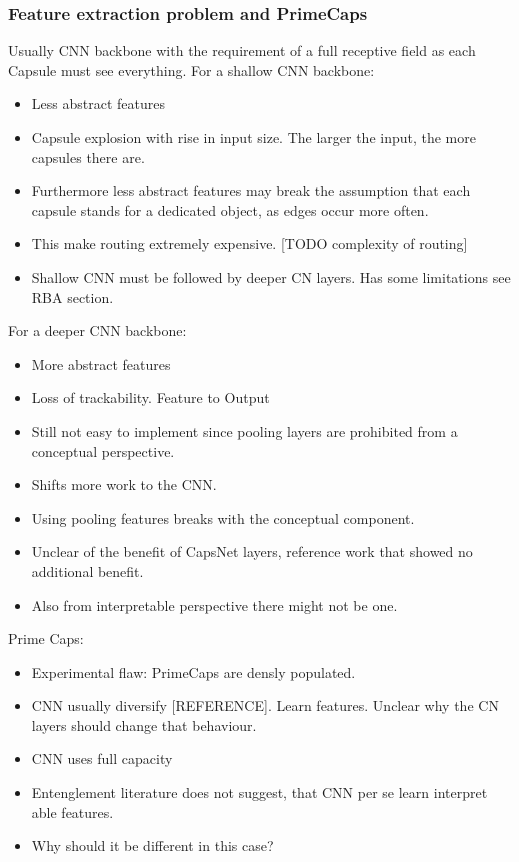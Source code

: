 \documentclass{article}
\begin{document}
\subsubsection*{Feature extraction problem and PrimeCaps}
Usually CNN backbone with the requirement of a full receptive field as each Capsule must see everything.
For a shallow CNN backbone:
\begin{itemize}
	\item Less abstract features
	\item Capsule explosion with rise in input size. The larger the input, the more capsules there are.
	\item Furthermore less abstract features may break the assumption that each capsule stands for a dedicated object, as edges occur more often.
	\item This make routing extremely expensive. [TODO complexity of routing]
	\item Shallow CNN must be followed by deeper CN layers. Has some limitations see RBA section.
\end{itemize}
For a deeper CNN backbone:
\begin{itemize}
	\item More abstract features
	\item Loss of trackability. Feature to Output
	\item Still not easy to implement since pooling layers are prohibited from a conceptual perspective.
	\item Shifts more work to the CNN.
	\item Using pooling features breaks with the conceptual component.
	\item Unclear of the benefit of CapsNet layers, reference work that showed no additional benefit.
	\item Also from interpretable perspective there might not be one.
\end{itemize}
Prime Caps:
\begin{itemize}
	\item Experimental flaw: PrimeCaps are densly populated.
	\item CNN usually diversify [REFERENCE]. Learn features. Unclear why the CN layers should change that behaviour.
	\item CNN uses full capacity
	\item Entenglement literature does not suggest, that CNN per se learn interpret able features.
	\item Why should it be different in this case?
\end{itemize}
\end{document}
